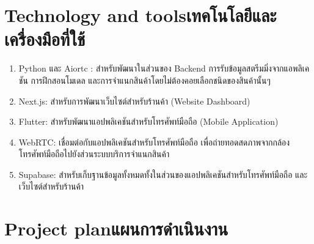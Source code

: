 \section{\ifenglish Technology and tools\else เทคโนโลยีและเครื่องมือที่ใช้\fi}
\begin{enumerate}
    \item Python และ Aiortc : สำหรับพัฒนาในส่วนของ Backend การรับข้อมูลสตรีมมิ่งจากแอพลิเคชัน การฝึกสอนโมเดล และการจำแนกสินค้าโดยไม่ต้องคอยเลือกชนิดของสินค้านั้นๆ
    \item Next.js: สําหรับการพัฒนาเว็บไซต์สำหรับร้านค้า (Website Dashboard)
    \item Flutter: สำหรับพัฒนาแอปพลิเคชันสำหรับโทรศัพท์มือถือ (Mobile Application)
    \item WebRTC: เชื่อมต่อกับแอปพลิเคชันสำหรับโทรศัพท์มือถือ เพื่อถ่ายทอดสดภาพจากกล้องโทรศัพท์มือถือไปยังส่วนระบบบริการจำแนกสินค้า
    \item Supabase: สําหรับเก็บฐานข้อมูลทั้งหมดทั้งในส่วนของแอปพลิเคชันสำหรับโทรศัพท์มือถือ และเว็บไซต์สำหรับร้านค้า

\end{enumerate}



\section{\ifenglish Project plan\else แผนการดำเนินงาน\fi}
%  

